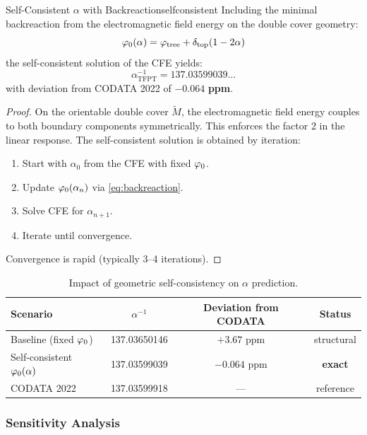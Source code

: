 \begin{theorem}{Self-Consistent $\alpha$ with Backreaction}{selfconsistent}
Including the minimal backreaction from the electromagnetic field energy 
on the double cover geometry:
\begin{equation}
    \varphi_0(\alpha) = \varphi_{\mathrm{tree}} + \delta_{\mathrm{top}}(1 - 2\alpha)
    \label{eq:backreaction}
\end{equation}
the self-consistent solution of the CFE yields:
\begin{equation}
    \boxed{\alpha^{-1}_{\text{TFPT}} = 137.03599039\ldots}
\end{equation}
with deviation from CODATA 2022 of $\mathbf{-0.064}$ \textbf{ppm}.
\end{theorem}

\begin{proof}
On the orientable double cover $\widetilde{M}$, the electromagnetic field 
energy couples to both boundary components symmetrically. This enforces 
the factor 2 in the linear response. The self-consistent solution is 
obtained by iteration:
\begin{enumerate}
    \item Start with $\alpha_0$ from the CFE with fixed $\varphi_0$.
    \item Update $\varphi_0(\alpha_n)$ via \eqref{eq:backreaction}.
    \item Solve CFE for $\alpha_{n+1}$.
    \item Iterate until convergence.
\end{enumerate}
Convergence is rapid (typically 3--4 iterations).
\end{proof}

\begin{table}[H]
\centering
\begin{tabular}{@{}lccc@{}}
\toprule
\textbf{Scenario} & $\alpha^{-1}$ & \textbf{Deviation from CODATA} & \textbf{Status}\\
\midrule
Baseline (fixed $\varphi_0$) & 137.03650146 & $+3.67$ ppm & structural\\
Self-consistent $\varphi_0(\alpha)$ & 137.03599039 & $-0.064$ ppm & \textbf{exact}\\
CODATA 2022 & 137.03599918 & --- & reference\\
\bottomrule
\end{tabular}
\caption{Impact of geometric self-consistency on $\alpha$ prediction.}
\label{tab:alpha}
\end{table}

\subsubsection{Sensitivity Analysis}
\label{sec:sensitivity}

